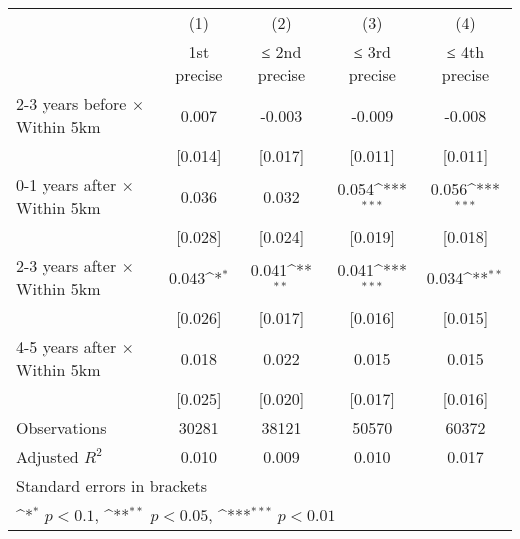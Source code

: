 {
\def\sym#1{\ifmmode^{#1}\else\(^{#1}\)\fi}
\begin{tabular}{l*{4}{c}}
\hline\hline
                    &\multicolumn{1}{c}{(1)}&\multicolumn{1}{c}{(2)}&\multicolumn{1}{c}{(3)}&\multicolumn{1}{c}{(4)}\\
                    &\multicolumn{1}{c}{1st precise}&\multicolumn{1}{c}{≤ 2nd precise}&\multicolumn{1}{c}{≤ 3rd precise}&\multicolumn{1}{c}{≤ 4th precise}\\
\hline
2-3 years before $\times$ Within 5km&       0.007         &      -0.003         &      -0.009         &      -0.008         \\
                    &     [0.014]         &     [0.017]         &     [0.011]         &     [0.011]         \\
0-1 years after $\times$ Within 5km&       0.036         &       0.032         &       0.054\sym{***}&       0.056\sym{***}\\
                    &     [0.028]         &     [0.024]         &     [0.019]         &     [0.018]         \\
2-3 years after $\times$ Within 5km&       0.043\sym{*}  &       0.041\sym{**} &       0.041\sym{***}&       0.034\sym{**} \\
                    &     [0.026]         &     [0.017]         &     [0.016]         &     [0.015]         \\
4-5 years after $\times$ Within 5km&       0.018         &       0.022         &       0.015         &       0.015         \\
                    &     [0.025]         &     [0.020]         &     [0.017]         &     [0.016]         \\
\hline
Observations        &       30281         &       38121         &       50570         &       60372         \\
Adjusted \(R^{2}\)  &       0.010         &       0.009         &       0.010         &       0.017         \\
\hline\hline
\multicolumn{5}{l}{\footnotesize Standard errors in brackets}\\
\multicolumn{5}{l}{\footnotesize \sym{*} \(p<0.1\), \sym{**} \(p<0.05\), \sym{***} \(p<0.01\)}\\
\end{tabular}
}
